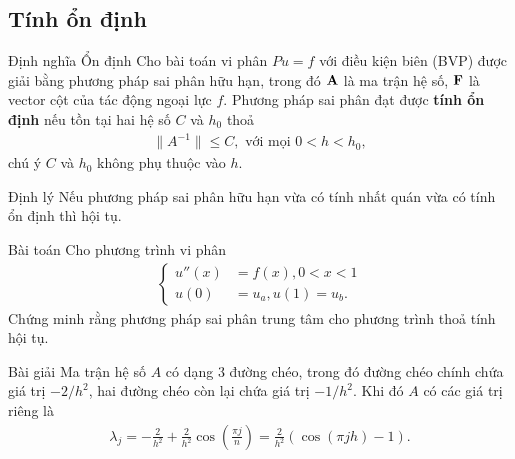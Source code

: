 \documentclass[9pt]{beamer}
\numberwithin{equation}{section}
\begin{document}
\subsection{Tính ổn định}

\begin{frame}
\begin{block}{Định nghĩa Ổn định}
    Cho bài toán vi phân $Pu = f$ với điều kiện biên (BVP) được giải bằng phương pháp sai phân hữu hạn, trong đó ${\bf A}$ là ma trận hệ số, ${\bf F}$ là vector cột của tác động ngoại lực $f$. Phương pháp sai phân đạt được \textbf{tính ổn định} nếu tồn tại hai hệ số $C$ và $h_0$ thoả
    \begin{align*}
        \|A^{-1}\| \le C, \text{ với mọi } 0 < h < h_0,
    \end{align*}
    chú ý $C$ và $h_0$ không phụ thuộc vào $h$.
\end{block}

\begin{exampleblock}{Định lý}
    Nếu phương pháp sai phân hữu hạn vừa có tính nhất quán vừa có tính ổn định thì hội tụ.
\end{exampleblock}
\end{frame}

\begin{frame}
\begin{block}{Bài toán}
Cho phương trình vi phân
\begin{align*}
    \begin{cases}
        u''(x) &= f(x), 0 < x < 1 \\
        u(0) &= u_a, u(1) = u_b.
    \end{cases}
\end{align*}
Chứng minh rằng phương pháp sai phân trung tâm cho phương trình thoả tính hội tụ.
\end{block}

\begin{exampleblock}{Bài giải}
    Ma trận hệ số $A$ có dạng 3 đường chéo, trong đó đường chéo chính chứa giá trị $-2/h^2$, hai đường chéo còn lại chứa giá trị $-1/h^2$. Khi đó  $A$ có các giá trị riêng là
    \begin{align*}
        \lambda_j = -\frac{2}{h^2} + \frac{2}{h^2} \cos \left(\frac{\pi j}{n}\right) = \frac{2}{h^2} \left(\cos(\pi jh) - 1\right).
    \end{align*}
\end{exampleblock}
\end{frame}
\end{document}
